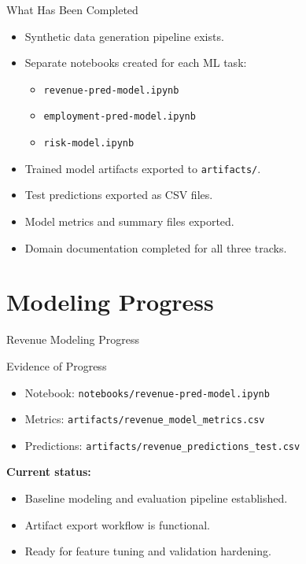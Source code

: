 \documentclass[10pt]{beamer}
\begin{document}
\begin{frame}{What Has Been Completed}
\begin{itemize}
    \item Synthetic data generation pipeline exists.
    \item Separate notebooks created for each ML task:
        \begin{itemize}
            \item \texttt{revenue-pred-model.ipynb}
            \item \texttt{employment-pred-model.ipynb}
            \item \texttt{risk-model.ipynb}
        \end{itemize}
    \item Trained model artifacts exported to \texttt{artifacts/}.
    \item Test predictions exported as CSV files.
    \item Model metrics and summary files exported.
    \item Domain documentation completed for all three tracks.
\end{itemize}
\end{frame}

\section{Modeling Progress}

\begin{frame}{Revenue Modeling Progress}
\begin{block}{Evidence of Progress}
\begin{itemize}
    \item Notebook: \texttt{notebooks/revenue-pred-model.ipynb}
    \item Metrics: \texttt{artifacts/revenue\_model\_metrics.csv}
    \item Predictions: \texttt{artifacts/revenue\_predictions\_test.csv}
\end{itemize}
\end{block}

\textbf{Current status:}
\begin{itemize}
    \item Baseline modeling and evaluation pipeline established.
    \item Artifact export workflow is functional.
    \item Ready for feature tuning and validation hardening.
\end{itemize}
\end{frame}
\end{document}
